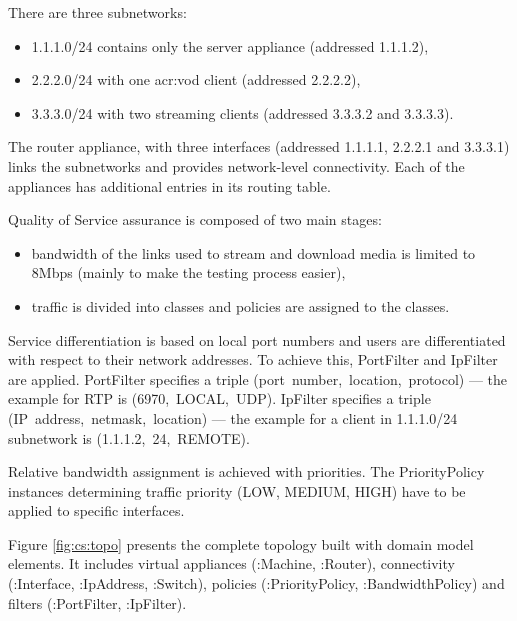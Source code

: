 \documentclass[11pt]{book}
\begin{document}
        There are three subnetworks:

        \begin{itemize}
          \item 1.1.1.0/24 contains only the server appliance (addressed 1.1.1.2),
          \item 2.2.2.0/24 with one \gls{acr:vod} client (addressed 2.2.2.2),
          \item 3.3.3.0/24 with two streaming clients (addressed 3.3.3.2 and 3.3.3.3).
        \end{itemize}

        The router appliance, with three interfaces (addressed 1.1.1.1, 2.2.2.1 and 3.3.3.1) links the subnetworks and
        provides network-level connectivity. Each of the appliances has additional entries in its routing table.

        Quality of Service assurance is composed of two main stages:

        \begin{itemize}
          \item bandwidth of the links used to stream and download media is limited to 8Mbps (mainly to make the
                testing process easier),
          \item traffic is divided into classes and policies are assigned to the classes.
        \end{itemize}

        Service differentiation is based on local port numbers and users are differentiated with respect to their
        network addresses. To achieve this, PortFilter and IpFilter are applied. PortFilter specifies a triple
        \mbox{(port number, location, protocol)} --- the example for RTP is \mbox{(6970, LOCAL, UDP)}. IpFilter
        specifies a triple \mbox{(IP address, netmask, location)} --- the example for a client in 1.1.1.0/24 subnetwork
        is \mbox{(1.1.1.2, 24, REMOTE)}.

        Relative bandwidth assignment is achieved with priorities. The PriorityPolicy instances determining traffic
        priority (LOW, MEDIUM, HIGH) have to be applied to specific interfaces.

        Figure \ref{fig:cs:topo} presents the complete topology built with domain model elements. It includes virtual
        appliances (:Machine, :Router), connectivity (:Interface, :IpAddress, :Switch), policies (:PriorityPolicy,
        :BandwidthPolicy) and filters (:PortFilter, :IpFilter).
\end{document}
